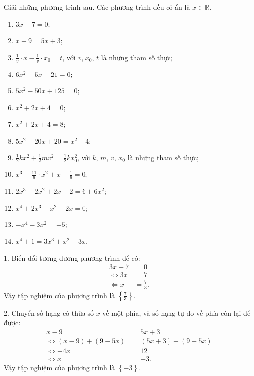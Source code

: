 \exercise Giải những phương trình sau. Các phương trình đều có ẩn là $x \in \mathbb{R}$.
\begin{multicols}{2}
   \begin{enumerate}
      \item $3x - 7 = 0$;
      \item $x - 9 = 5x + 3$;
      \item $\frac{1}{v}\cdot x - \frac{1}{v} \cdot x_0 = t$, với $v$, $x_0$, $t$ là những tham số thực;
      \item $6x^2 - 5x - 21 = 0$;
      \item $5x^2 - 50x + 125 = 0$;
      \item $x^2 + 2x + 4 = 0$;
      \item $x^2 + 2x + 4 = 8$;
      \item $5x^2 - 20x + 20 = x^2 - 4$;
      \item $\frac{1}{2}kx^2 + \frac{1}{2}mv^2 = \frac{1}{2}kx_0^2$, với $k$, $m$, $v$, $x_0$ là những tham số thực;
      \item $x^3 - \frac{11}{6}\cdot x^2 + x - \frac{1}{6} = 0$;
      \item $2x^3 - 2x^2 + 2x - 2 = 6 + 6x^2$;
      \item $x^4+2x^3-x^2-2x=0$;
      \item $-x^4 -3x^2 = -5$;
      \item $x^4 + 1 = 3x^3 + x^2 + 3x$.
   \end{enumerate}
\end{multicols}

\solution

1. Biến đổi tương đương phương trình để có:
\begin{align*}
   3x - 7 &= 0 \\
   \iff 3x &= 7\\
   \iff x &= \frac{7}{3}.
\end{align*}
Vậy tập nghiệm của phương trình là $\displaystyle\left\{\frac{7}{3}\right\}$.

2. Chuyển số hạng có thừa số $x$ về một phía, và số hạng tự do về phía còn lại để được:
\begin{align*}
   x - 9 &= 5x + 3 \\
   \iff (x - 9) + (9 - 5x) &= (5x + 3) + (9 - 5x) \\ 
   \iff -4x &= 12 \\
   \iff x &= -3.
\end{align*}
Vậy tập nghiệm của phương trình là $\displaystyle\left\{-3\right\}$.

